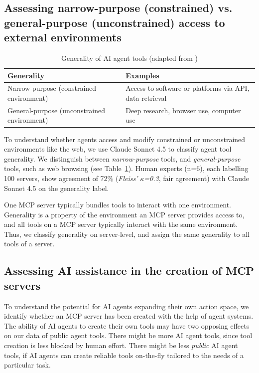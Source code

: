 \documentclass[manuscript,screen,nonacm,oneside]{acmart}
\begin{document}
\subsection{Assessing narrow-purpose (constrained) vs. general-purpose (unconstrained) access to external environments}
\label{sec:generality}

\begin{table}[htbp]
\centering
\caption{Generality of AI agent tools (adapted from \citet{CAISI2025})}
\small
\begin{tabular}{ll}
\toprule
\textbf{Generality} & \textbf{Examples} \\
\midrule
Narrow-purpose (constrained environment) & Access to software or platforms via API, data retrieval \\
General-purpose (unconstrained environment) & Deep research, browser use, computer use \\
\bottomrule
\end{tabular}
\label{tab:generality}
\end{table}
To understand whether agents access and modify constrained or unconstrained environments like the web, we use Claude Sonnet 4.5 to classify agent tool generality. We distinguish between \emph{narrow-purpose} tools, and \emph{general-purpose} tools, such as web browsing (see Table~\ref{tab:generality}). 
Human experts (n=6), each labelling 100 servers, show agreement of 72\% (\emph{Fleiss'} \(\kappa\)\emph{=0.3}, fair agreement) with Claude Sonnet 4.5 on the generality label. 

One MCP server typically bundles tools to interact with one environment. Generality is a property of the environment an MCP server provides access to, and all tools on a MCP server typically interact with the same environment. Thus, we classify generality on server-level, and assign the same generality to all tools of a server.


\subsection{Assessing AI assistance in the creation of MCP servers}
\label{sec:ai-detection-method}

To understand the potential for AI agents expanding their own action space, we identify whether an MCP server has been created with the help of agent systems. The ability of AI agents to create their own tools may have two opposing effects on our data of public agent tools. There might be more AI agent tools, since tool creation is less blocked by human effort. There might be less \textit{public} AI agent tools, if AI agents can create reliable tools on-the-fly tailored to the needs of a particular task.
\end{document}
